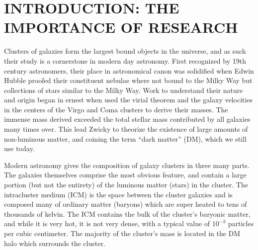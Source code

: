 %
%
%



\pagestyle{plain} %
\setcounter{page}{1}


\renewcommand*{\thefootnote}{\fnsymbol{footnote}}
\chapter[Introduction: The Importance of Research]{\uppercase {Introduction: The Importance of Research} }
\renewcommand*{\thefootnote}{\arabic{footnote}}
\setcounter{footnote}{0}


Clusters of galaxies form the largest bound objects in the universe, and as such their study is a cornerstone in modern day astronomy. First recognized by 19th century astronomers, their place in astronomical canon was solidified when Edwin Hubble proofed their constituent nebulae where not bound to the Milky Way \citep{Hubble1926} but collections of stars similar to the Milky Way. Work to understand their nature and origin began in ernest when \cite{Hubble1931} used the virial theorem and the galaxy velocities in the centers of the Virgo \citep{Smith1936} and Coma \citep{Zwicky1933} clusters to derive their masses. The immense mass derived exceeded the total stellar mass contributed by all galaxies many times over. This lead Zwicky to theorize the existence of large amounts of non-luminous matter, and coining the term ``dark matter'' (DM), which we still use today.  

Modern astronomy gives the composition of galaxy clusters in three many parts. The galaxies themselves comprise the most obvious feature, and contain a large portion (but not the entirety) of the luminous matter (stars) in the cluster. The intracluster medium (ICM) is the space between the cluster galaxies and is composed many of ordinary matter (baryons) which are super heated to tens of thousands of kelvin. The ICM contains the bulk of the cluster's baryonic matter, and while it is very hot, it is not very dense, with a typical value of $10^{-3}$ particles per cubic centimeter. The majority of the cluster's mass is located in the DM halo which surrounds the cluster. 

